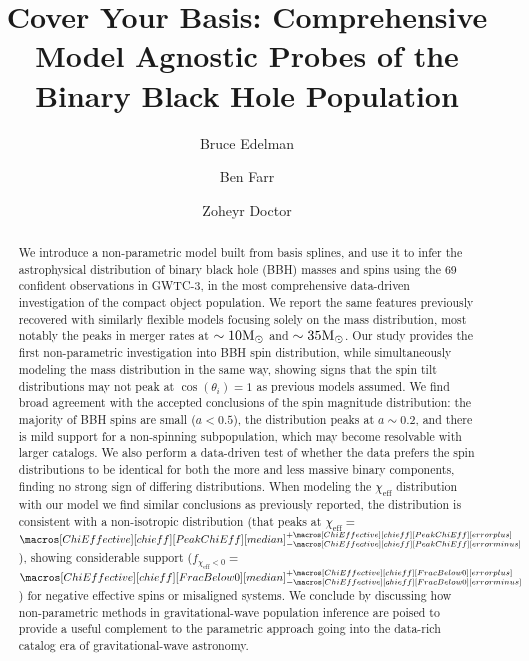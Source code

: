 \documentclass[twocolumn, linenumbers]{aastex631}
\newcommand{\msun}{\ensuremath{{\rm M}_\odot}}
\newcommand{\result}[1]{\textcolor{red}{#1}}
\newcommand{\CIPlusMinus}[1]{{#1[median]^{+#1[error plus]}_{-#1[error minus]}}}
\begin{document}
\title{Cover Your Basis: Comprehensive Model Agnostic Probes of the Binary Black Hole Population}

\author{Bruce Edelman}
\author{Ben Farr}
\author{Zoheyr Doctor}

\begin{abstract}                 
We introduce a non-parametric model built from basis splines, and use it to infer the astrophysical distribution of 
binary black hole (BBH) masses and spins using the 69 confident observations in GWTC-3, in the most comprehensive data-driven
investigation of the compact object population. We report the same features previously recovered 
with similarly flexible models focusing solely on the mass distribution, most notably the peaks in merger rates at $\sim10\msun$ and $\sim35\msun$. 
Our study provides the first non-parametric investigation into BBH spin distribution, while simultaneously modeling the mass distribution in the same way, 
showing signs that the spin tilt distributions may not peak at $\cos(\theta_i) = 1$ as previous models assumed. We find broad agreement with the 
accepted conclusions of the spin magnitude distribution: the majority of BBH spins are small ($a<0.5$), the distribution peaks at $a\sim0.2$, 
and there is mild support for a non-spinning subpopulation, which may become resolvable with larger catalogs. 
We also perform a data-driven test of whether the data prefers the spin distributions to be identical for both the more and less massive binary components, 
finding no strong sign of differing distributions. When modeling the $\chi_\mathrm{eff}$ distribution with our model we find similar 
conclusions as previously reported, the distribution is consistent with a non-isotropic distribution (that peaks at $\chi_\mathrm{eff}=\,$\result{$\CIPlusMinus{\macros[ChiEffective][chieff][PeakChiEff]}$}), 
showing considerable support ($f_{\chi_\mathrm{eff}<0}=\,$\result{$\CIPlusMinus{\macros[ChiEffective][chieff][FracBelow0]}$}) for negative effective spins or misaligned systems.
We conclude by discussing how non-parametric methods in gravitational-wave population inference are poised to provide a useful complement to 
the parametric approach going into the data-rich catalog era of gravitational-wave astronomy.
\end{abstract}
\end{document}
